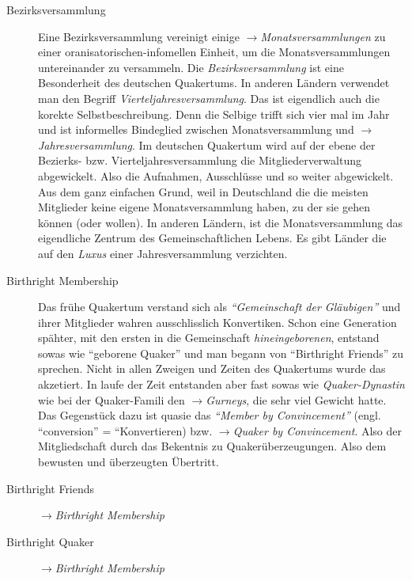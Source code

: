 \begin{description}
 \item[Bezirksversammlung] Eine Bezirksversammlung vereinigt einige $\to$\textit{Monatsversammlungen} zu einer oranisatorischen-infomellen Einheit, um die Monatsversammlungen untereinander zu versammeln. Die \textit{Bezirksversammlung} ist eine Besonderheit des deutschen Quakertums. In anderen Ländern verwendet man den Begriff \textit{Vierteljahresversammlung}. Das ist eigendlich auch die korekte Selbstbeschreibung. Denn die Selbige trifft sich vier mal im Jahr und ist informelles Bindeglied zwischen Monatsversammlung und $\to$\textit{Jahresversammlung}. Im deutschen Quakertum wird auf der ebene der Bezierks- bzw. Vierteljahresversammlung die Mitgliederverwaltung abgewickelt. Also die Aufnahmen, Ausschlüsse und so weiter abgewickelt. Aus dem ganz einfachen Grund, weil in Deutschland die die meisten Mitglieder keine eigene Monatsversammlung haben, zu der sie gehen können (oder wollen). In anderen Ländern, ist die Monatsversammlung das eigendliche Zentrum des Gemeinschaftlichen Lebens. Es gibt Länder die auf den \textit{Luxus} einer Jahresversammlung verzichten.
 
 \item[Birthright Membership] Das frühe Quakertum verstand sich als \textit{"`Gemeinschaft der Gläubigen"'} und ihrer Mitglieder wahren ausschlisslich Konvertiken. Schon eine Generation spähter, mit den ersten in die Gemeinschaft \textit{hineingeborenen}, entstand sowas wie "`geborene Quaker"' und man begann von "`Birthright Friends"' zu sprechen. Nicht in allen Zweigen und Zeiten des Quakertums wurde das akzetiert. In laufe der Zeit entstanden aber fast sowas wie \textit{Quaker-Dynastin} wie bei der Quaker-Famili den $\to$\textit{Gurneys}, die sehr viel Gewicht hatte. Das Gegenstück dazu ist quasie das \textit{"`Member by Convincement"'} (engl. ``conversion'' = ``Konvertieren) bzw. $\to$\textit{Quaker by Convincement}. Also der Mitgliedschaft durch das Bekentnis zu Quakerüberzeugungen. Also dem bewusten und überzeugten Übertritt.
 
 \item[Birthright Friends] $\to$\textit{Birthright Membership}
 
 \item[Birthright Quaker] $\to$\textit{Birthright Membership}


\end{description}
